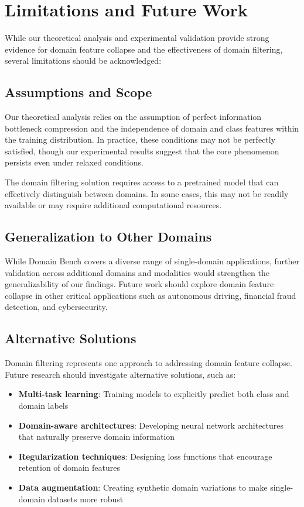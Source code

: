 \documentclass[11pt, oneside]{book}
\theoremstyle{plain}
\theoremstyle{definition}
\theoremstyle{remark}
\begin{document}
\section{Limitations and Future Work}

While our theoretical analysis and experimental validation provide strong evidence for domain feature collapse and the effectiveness of domain filtering, several limitations should be acknowledged:

\subsection{Assumptions and Scope}

Our theoretical analysis relies on the assumption of perfect information bottleneck compression and the independence of domain and class features within the training distribution. In practice, these conditions may not be perfectly satisfied, though our experimental results suggest that the core phenomenon persists even under relaxed conditions.

The domain filtering solution requires access to a pretrained model that can effectively distinguish between domains. In some cases, this may not be readily available or may require additional computational resources.

\subsection{Generalization to Other Domains}

While Domain Bench covers a diverse range of single-domain applications, further validation across additional domains and modalities would strengthen the generalizability of our findings. Future work should explore domain feature collapse in other critical applications such as autonomous driving, financial fraud detection, and cybersecurity.

\subsection{Alternative Solutions}

Domain filtering represents one approach to addressing domain feature collapse. Future research should investigate alternative solutions, such as:

\begin{itemize}
\item \textbf{Multi-task learning}: Training models to explicitly predict both class and domain labels
\item \textbf{Domain-aware architectures}: Developing neural network architectures that naturally preserve domain information
\item \textbf{Regularization techniques}: Designing loss functions that encourage retention of domain features
\item \textbf{Data augmentation}: Creating synthetic domain variations to make single-domain datasets more robust
\end{itemize}
\end{document}
